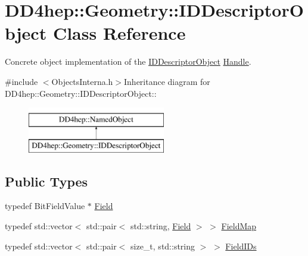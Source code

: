 \hypertarget{class_d_d4hep_1_1_geometry_1_1_i_d_descriptor_object}{
\section{DD4hep::Geometry::IDDescriptorObject Class Reference}
\label{class_d_d4hep_1_1_geometry_1_1_i_d_descriptor_object}
}


Concrete object implementation of the \hyperlink{class_d_d4hep_1_1_geometry_1_1_i_d_descriptor_object}{IDDescriptorObject} \hyperlink{class_d_d4hep_1_1_handle}{Handle}.  


{\ttfamily \#include $<$ObjectsInterna.h$>$}Inheritance diagram for DD4hep::Geometry::IDDescriptorObject::\begin{figure}[H]
\begin{center}
\leavevmode
\includegraphics[height=2cm]{class_d_d4hep_1_1_geometry_1_1_i_d_descriptor_object}
\end{center}
\end{figure}
\subsection*{Public Types}
\begin{DoxyCompactItemize}
\item 
typedef BitFieldValue $\ast$ \hyperlink{class_d_d4hep_1_1_geometry_1_1_i_d_descriptor_object_acd5cae904f0db0ed0805ef1077ce2111}{Field}
\item 
typedef std::vector$<$ std::pair$<$ std::string, \hyperlink{class_d_d4hep_1_1_geometry_1_1_i_d_descriptor_object_acd5cae904f0db0ed0805ef1077ce2111}{Field} $>$ $>$ \hyperlink{class_d_d4hep_1_1_geometry_1_1_i_d_descriptor_object_a784af03aa08575a914c2399b45eae052}{FieldMap}
\item 
typedef std::vector$<$ std::pair$<$ size\_\-t, std::string $>$ $>$ \hyperlink{class_d_d4hep_1_1_geometry_1_1_i_d_descriptor_object_aa9d779170fd1d2221d27f3b63df6d6d4}{FieldIDs}
\end{DoxyCompactItemize}
